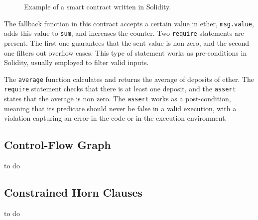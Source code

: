 \begin{figure}

\caption{Example of a smart contract written in Solidity.}
\label{fig:contractC}
\end{figure}

The fallback function in this contract accepts a certain value in ether,
\texttt{msg.value}, adds this value to \texttt{sum}, and increases the counter.
Two \texttt{require} statements are present. The first one guarantees that the
sent value is non zero, and the second one filters out overflow cases. This
type of statement works as pre-conditions in Solidity, usually employed to
filter valid inputs.

The \texttt{average} function calculates and returns the average of deposits of
ether. The \texttt{require} statement checks that there is at least one
deposit, and the \texttt{assert} states that the average is non zero. The
\texttt{assert} works as a post-condition, meaning that its predicate should
never be false in a valid execution, with a violation capturing an error in the
code or in the execution environment.


\subsection{Control-Flow Graph} \label{sec:background_cfg}

to do


\subsection{Constrained Horn Clauses} \label{sec:background_chc}

to do